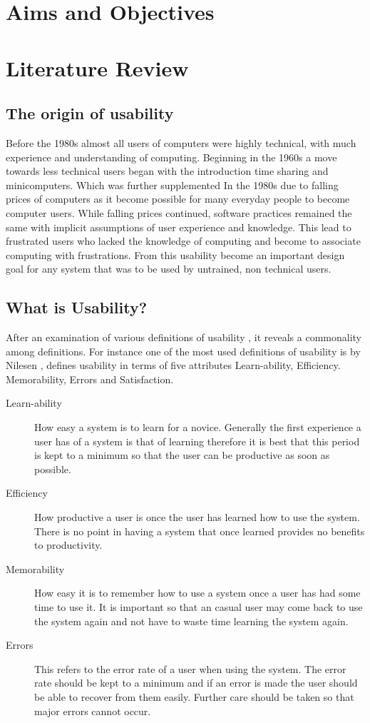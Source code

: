 \documentclass[a4paper,oneside,11pt]{report}
\begin{document}
\tableofcontents

\chapter{Aims and Objectives}
\chapter{Literature Review}
\section{The origin of usability}
Before the 1980s almost all users of computers were highly technical, with much experience and understanding of computing. Beginning in the 1960s a move towards less technical users began with the introduction time sharing and minicomputers. Which was further supplemented In the 1980s due to falling prices of computers as it become possible for many everyday people to become computer users. While falling prices continued, software practices remained the same with implicit assumptions of user experience and knowledge. This lead to frustrated users who lacked the knowledge of computing and become to associate computing with frustrations. From this usability become an important design goal for any system that was to be used by untrained, non technical users. \autocite{gilbert2013}

\section{What is Usability?}
After an examination of various definitions of usability , it reveals a commonality among definitions. 
For instance one of the most used definitions of usability is by Nilesen\autocite{nielsens1993} , defines usability in terms of five attributes Learn-ability, Efficiency. Memorability, Errors and Satisfaction.
\begin{description}
  \item[Learn-ability]How easy a system is to learn for a novice. Generally the first experience a user has of a system is that of learning therefore it is best that this period is kept to a minimum so that the user can be productive as soon as possible.
  \item[Efficiency] How productive a user is once the user has learned how to use the system. There is no point in having a system that once learned provides no benefits to productivity.
  \item[Memorability] How easy it is to remember how to use a system once a user has had some time to use it.  It is important so that an casual user may come back to use the system again and not have to waste time learning the system again.
  \item[Errors] This refers to the error rate of a user when using the system. The error rate should be kept to a minimum and if an error is made the user should be able to recover from them easily. Further care should be taken so that major errors cannot occur.
\end{description}
\end{document}
